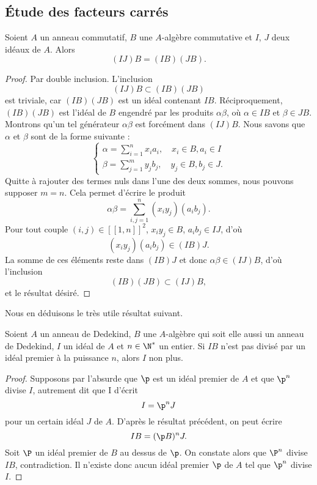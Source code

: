 \documentclass[a4paper, 12pt, oneside]{article}
\begin{document}
\subsection{Étude des facteurs carrés}

\begin{lemme}Soient $A$ un anneau commutatif, $B$ une $A$-algèbre commutative et $I$, $J$ deux idéaux de $A$. Alors $$(IJ) B = (IB)(JB).$$
\end{lemme}

\begin{proof}
	Par double inclusion. L'inclusion $$(IJ)B \subset (IB)(JB)$$ est triviale, car $(IB)(JB)$ est un idéal contenant $IB$. Réciproquement, $(IB)(JB)$ est l'idéal de $B$ engendré par les produits $\alpha\beta$, où $\alpha \in IB$ et $\beta\in JB$. Montrons qu'un tel générateur $\alpha\beta$ est forcément dans $(IJ)B$. Nous savons que $\alpha$ et $\beta$ sont de la forme suivante :
	$$\begin{cases}
		\displaystyle \alpha = \sum_{i=1}^n x_i a_i, \quad x_i\in B, a_i \in I \\
		\displaystyle\beta = \sum_{j=1}^m y_j b_j, \quad y_j\in B, b_j \in J.
	\end{cases}$$
	Quitte à rajouter des termes nuls dans l'une des deux sommes, nous pouvons supposer $m=n$. Cela permet d'écrire le produit $$\alpha\beta = \sum_{i,j=1}^n (x_iy_j) (a_i b_j).$$ Pour tout couple $(i, j) \in [\![ 1, n]\!] ^2$, $x_iy_j \in B$, $a_i b_j\in IJ$, d'où $$(x_i y_j)(a_i b_j) \in (IB)J.$$ La somme de ces éléments reste dans $(IB)J$ et donc $\alpha \beta \in (IJ)B$, d'où l'inclusion $$(IB)(JB) \subset (IJ)B,$$ et le résultat désiré.
\end{proof}

Nous en déduisons le très utile résultat suivant.

\begin{lemme}Soient $A$ un anneau de Dedekind, $B$ une $A$-algèbre qui soit elle aussi un anneau de Dedekind, $I$ un idéal de $A$ et $n\in \N^*$ un entier. Si $IB$ n'est pas divisé par un idéal premier à la puissance $n$, alors $I$ non plus.
\end{lemme}

\begin{proof}
Supposons par l'absurde que $\p$ est un idéal premier de $A$ et que $\p^n$ divise $I$, autrement dit que I d'écrit $$I = \p^n J$$ pour un certain idéal $J$ de $A$. D'après le résultat précédent, on peut écrire $$IB = (\p B)^n J.$$ Soit $\P$ un idéal premier de $B$ au dessus de $\p$. On constate alors que $\P^n$ divise $IB$, contradiction. Il n'existe donc aucun idéal premier $\p$ de $A$ tel que $\p^n$ divise $I$.
\end{proof}
\end{document}
